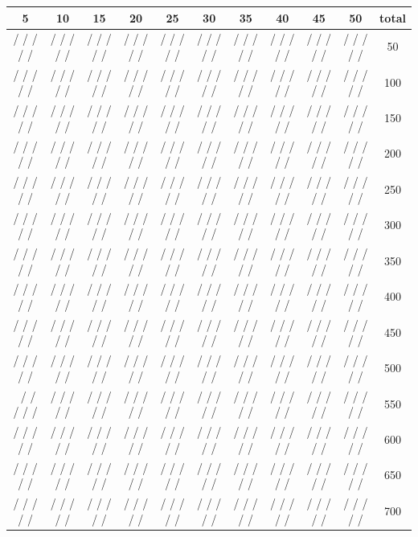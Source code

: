 \begin{appendices}
\begin{landscape}
\vspace{1cm}

 \begin{tabular}{ccccccccccc}
 \hline
    5 & 10 & 15 & 20 & 25 & 30 & 35 & 40 & 45 & 50 & total \\ \hline
    / / / / / & / / / / / & / / / / / & / / / / / & / / / / / & / / / / / & / / / / / & / / / / / & / / / / / & / / / / /  & 50 \\
     / / / / / & / / / / / & / / / / / & / / / / / & / / / / / & / / / / / & / / / / / & / / / / / & / / / / / & / / / / /  & 100 \\
      / / / / / & / / / / / & / / / / / & / / / / / & / / / / / & / / / / / & / / / / / & / / / / / & / / / / / & / / / / / & 150 \\
       / / / / / & / / / / / & / / / / / & / / / / / & / / / / / & / / / / / & / / / / / & / / / / / & / / / / / & / / / / /  & 200\\
        / / / / / & / / / / / & / / / / / & / / / / / & / / / / / & / / / / / & / / / / / & / / / / / & / / / / / & / / / / /  & 250 \\
         / / / / / & / / / / / & / / / / / & / / / / / & / / / / / & / / / / / & / / / / / & / / / / / & / / / / / & / / / / /  & 300 \\
     / / / / / & / / / / / & / / / / / & / / / / / & / / / / / & / / / / / & / / / / / & / / / / / & / / / / / & / / / / / & 350 \\
      / / / / / & / / / / / & / / / / / & / / / / / & / / / / / & / / / / / & / / / / / & / / / / / & / / / / / & / / / / /  & 400 \\
       / / / / / & / / / / / & / / / / / & / / / / / & / / / / / & / / / / / & / / / / / & / / / / / & / / / / / & / / / / / & 450 \\
        / / / / / & / / / / / & / / / / / & / / / / / & / / / / / & / / / / / & / / / / / & / / / / / & / / / / / & / / / / / & 500 \\ \
         / / / / / & / / / / / & / / / / / & / / / / / & / / / / / & / / / / / & / / / / / & / / / / / & / / / / / & / / / / /  & 550 \\
     / / / / / & / / / / / & / / / / / & / / / / / & / / / / / & / / / / / & / / / / / & / / / / / & / / / / / & / / / / /  & 600 \\
      / / / / / & / / / / / & / / / / / & / / / / / & / / / / / & / / / / / & / / / / / & / / / / / & / / / / / & / / / / / & 650 \\
       / / / / / & / / / / / & / / / / / & / / / / / & / / / / / & / / / / / & / / / / / & / / / / / & / / / / / & / / / / /  & 700\\

\end{tabular}
\end{landscape}
\end{appendices}
